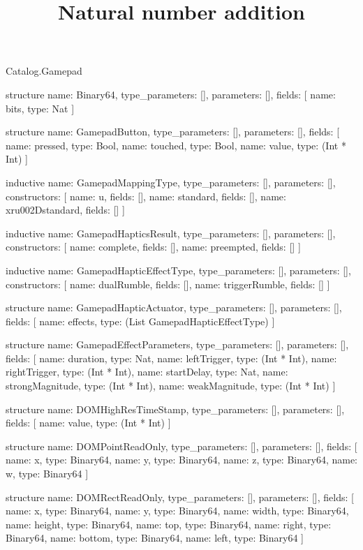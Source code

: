 \begin{lexlean}{Catalog.Gamepad}
\title{Natural number addition}
\begin{semanticmodule}
structure{
  name: Binary64,
  type_parameters: [],
  parameters: [],
  fields: [
    {name: bits, type: Nat}
  ]
}

structure{
  name: GamepadButton,
  type_parameters: [],
  parameters: [],
  fields: [
    {name: pressed, type: Bool},
    {name: touched, type: Bool},
    {name: value, type: (Int * Int)}
  ]
}

inductive{
  name: GamepadMappingType,
  type_parameters: [],
  parameters: [],
  constructors: [
    {name: u, fields: []},
    {name: standard, fields: []},
    {name: xru002Dstandard, fields: []}
  ]
}

inductive{
  name: GamepadHapticsResult,
  type_parameters: [],
  parameters: [],
  constructors: [
    {name: complete, fields: []},
    {name: preempted, fields: []}
  ]
}

inductive{
  name: GamepadHapticEffectType,
  type_parameters: [],
  parameters: [],
  constructors: [
    {name: dualRumble, fields: []},
    {name: triggerRumble, fields: []}
  ]
}

structure{
  name: GamepadHapticActuator,
  type_parameters: [],
  parameters: [],
  fields: [
    {name: effects, type: (List GamepadHapticEffectType)}
  ]
}

structure{
  name: GamepadEffectParameters,
  type_parameters: [],
  parameters: [],
  fields: [
    {name: duration, type: Nat},
    {name: leftTrigger, type: (Int * Int)},
    {name: rightTrigger, type: (Int * Int)},
    {name: startDelay, type: Nat},
    {name: strongMagnitude, type: (Int * Int)},
    {name: weakMagnitude, type: (Int * Int)}
  ]
}

structure{
  name: DOMHighResTimeStamp,
  type_parameters: [],
  parameters: [],
  fields: [
    {name: value, type: (Int * Int)}
  ]
}

structure{
  name: DOMPointReadOnly,
  type_parameters: [],
  parameters: [],
  fields: [
    {name: x, type: Binary64},
    {name: y, type: Binary64},
    {name: z, type: Binary64},
    {name: w, type: Binary64}
  ]
}

structure{
  name: DOMRectReadOnly,
  type_parameters: [],
  parameters: [],
  fields: [
    {name: x, type: Binary64},
    {name: y, type: Binary64},
    {name: width, type: Binary64},
    {name: height, type: Binary64},
    {name: top, type: Binary64},
    {name: right, type: Binary64},
    {name: bottom, type: Binary64},
    {name: left, type: Binary64}
  ]
}


\end{semanticmodule}
\end{lexlean}
